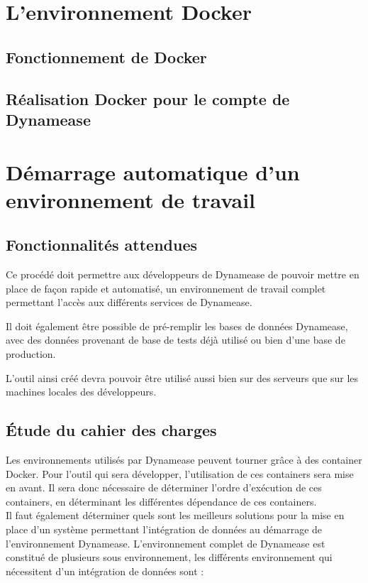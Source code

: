 \section{L'environnement Docker}
\subsection{Fonctionnement de Docker}
\subsection{Réalisation Docker pour le compte de Dynamease}

\section{Démarrage automatique d'un environnement de travail}

\subsection{Fonctionnalités attendues}

Ce procédé doit permettre aux développeurs de Dynamease de pouvoir mettre en place de façon rapide et automatisé, un environnement de travail complet permettant l'accès aux différents services de Dynamease. 

Il doit également être possible de pré-remplir les bases de données Dynamease, avec des données provenant de base de tests déjà utilisé ou bien d'une base de production.

L'outil ainsi créé devra pouvoir être utilisé aussi bien sur des serveurs que sur les machines locales des développeurs. 

\subsection{Étude du cahier des charges}

Les environnements utilisés par Dynamease peuvent tourner grâce à des container Docker. Pour l'outil qui sera développer, l'utilisation de ces containers sera mise en avant. Il sera donc nécessaire de déterminer l'ordre d'exécution de ces containers, en déterminant les différentes dépendance de ces containers.\\

Il faut également déterminer quels sont les meilleurs solutions pour la mise en place d'un système permettant l'intégration de données au démarrage de l'environnement Dynamease. L'environnement complet de Dynamease est constitué de plusieurs sous environnement, les différents environnement qui nécessitent d'un intégration de données sont :

